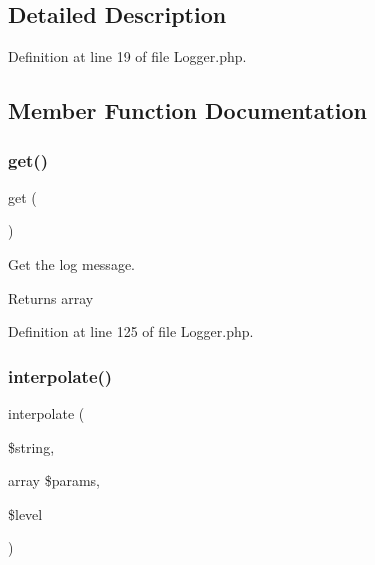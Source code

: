 \subsection{Detailed Description}


Definition at line 19 of file Logger.\+php.



\subsection{Member Function Documentation}
\mbox{\label{class_zest_1_1_common_1_1_logger_1_1_logger_ac33ee765f5ad9f134540bac393721cfe}} 
\subsubsection{\texorpdfstring{get()}{get()}}
{\footnotesize\ttfamily get (\begin{DoxyParamCaption}{ }\end{DoxyParamCaption})}

Get the log message.

\begin{DoxyReturn}{Returns}
array 
\end{DoxyReturn}


Definition at line 125 of file Logger.\+php.

\mbox{\label{class_zest_1_1_common_1_1_logger_1_1_logger_a893257e3671946329ca52be5c62d7e8d}} 
\subsubsection{\texorpdfstring{interpolate()}{interpolate()}}
{\footnotesize\ttfamily interpolate (\begin{DoxyParamCaption}\item[{}]{\$string,  }\item[{array}]{\$params,  }\item[{}]{\$level }\end{DoxyParamCaption})}

